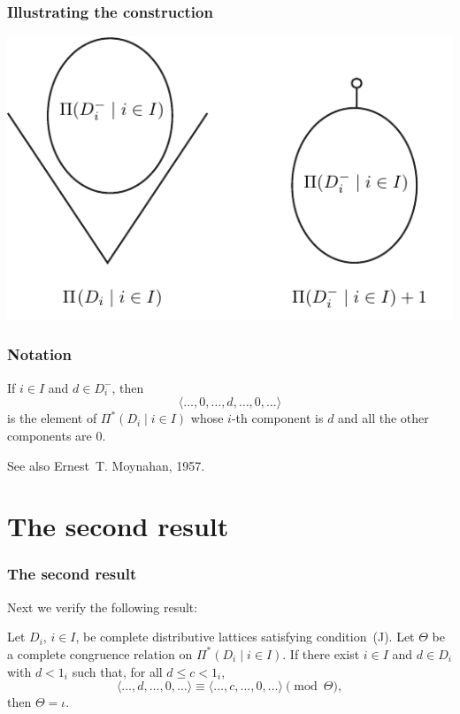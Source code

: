 \documentclass{beamer}
\begin{document}
\begin{frame}
\frametitle{Illustrating the construction}

\centering\includegraphics{products}
\end{frame}

\begin{frame}
\frametitle{Notation}

If $i \in I$ and $d \in D_{i}^{-}$, then
\[
  \langle \ldots, 0, \ldots, d, \ldots, 0, \ldots \rangle
\]
is the element of $\Pi^{*} ( D_{i} \mid i \in I )$ whose 
$i$-th component is $d$ and all the other components 
are $0$.

See also Ernest~T. Moynahan, 1957.
\end{frame}

\section[Second result]{The second result}

\begin{frame}
\frametitle{The second result}

Next we verify the following result:

\begin{theorem}
Let $D_{i}$, $i \in I$, be complete distributive 
lattices satisfying condition~\textup{(J)}.  
Let $\Theta$ be a complete congruence relation on 
$\Pi^{*} ( D_{i} \mid i \in I )$. 
If there exist $i \in I$ and $d \in D_{i}$ with 
$d < 1_{i}$ such that, for all $d \leq c < 1_{i}$, 
\begin{equation*}
   \langle \ldots, d, \ldots, 0, \ldots \rangle \equiv 
   \langle \ldots, c, \ldots, 0, \ldots \rangle 
   \pmod{\Theta}, 
\end{equation*}
then $\Theta = \iota$.
\end{theorem}
\end{frame}
\end{document}
